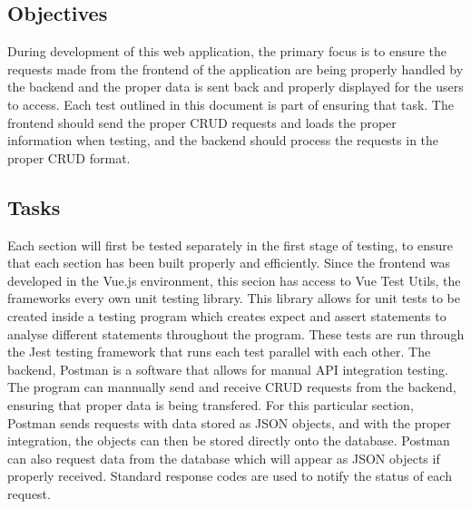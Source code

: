 \subsection{Objectives}
During development of this web application, the primary focus is to ensure the requests made from the frontend of the application are being properly handled by the backend and the proper data is sent back and properly displayed for the users to access. Each test outlined in this document is part of ensuring that task. The frontend should send the proper CRUD requests and loads the proper information when testing, and the backend should process the requests in the proper CRUD format. 

\subsection{Tasks}
Each section will first be tested separately in the first stage of testing, to ensure that each section has been built properly and efficiently. Since the frontend was developed in the Vue.js environment, this secion has access to Vue Test Utils, the frameworks every own unit testing library. This library allows for unit tests to be created inside a testing program which creates expect and assert statements to analyse different statements throughout the program. These tests are run through the Jest testing framework that runs each test parallel with each other. The backend, Postman is a software that allows for manual API integration testing. The program can mannually send and receive CRUD requests from the backend, ensuring that proper data is being transfered. For this particular section, Postman sends requests with data stored as JSON objects, and with the proper integration, the objects can then be stored directly onto the database. Postman can also request data from the database which will appear as JSON objects if properly received. Standard response codes are used to notify the status of each request. 
\newline
